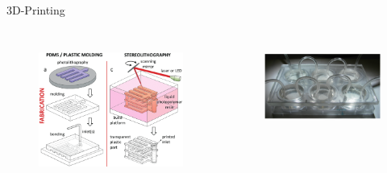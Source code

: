 \documentclass{beamer}
\begin{document}
\begin{frame}{3D-Printing}
\begin{columns}[c] %
\begin{figure}
\includegraphics[width=0.8\linewidth]{images/3D-fab.png}\\
\hspace*{11pt}\hbox{\scriptsize {}}
 \end{figure}
\begin{figure}
\includegraphics[width=1\linewidth]{images/oppegard1.png}\\
\hspace*{11pt}\hbox{\scriptsize {}}

\end{figure}
\end{columns}
\end{frame}
\end{document}
